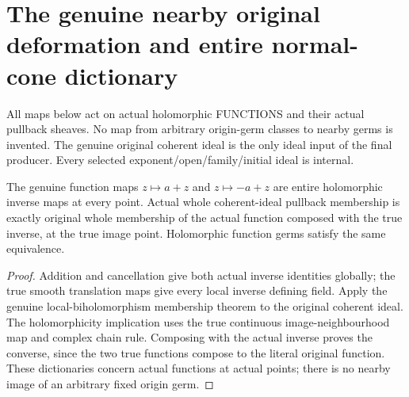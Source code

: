 \section{The genuine nearby original deformation and entire normal-cone dictionary}
All maps below act on actual holomorphic FUNCTIONS and their actual pullback sheaves. No map from arbitrary origin-germ classes to nearby germs is invented. The genuine original coherent ideal is the only ideal input of the final producer. Every selected exponent/open/family/initial ideal is internal.

\begin{lemma}
\label{hir:relative-normal-affine-dnc-inverse}
\leanok
The genuine function maps $z\mapsto a+z$ and $z\mapsto -a+z$ are entire holomorphic inverse maps at every point. Actual whole coherent-ideal pullback membership is exactly original whole membership of the actual function composed with the true inverse, at the true image point. Holomorphic function germs satisfy the same equivalence.
\end{lemma}
\begin{proof}
Addition and cancellation give both actual inverse identities globally; the true smooth translation maps give every local inverse defining field. Apply the genuine local-biholomorphism membership theorem to the original coherent ideal. The holomorphicity implication uses the true continuous image-neighbourhood map and complex chain rule. Composing with the actual inverse proves the converse, since the two true functions compose to the literal original function. These dictionaries concern actual functions at actual points; there is no nearby image of an arbitrary fixed origin germ.
\end{proof}

